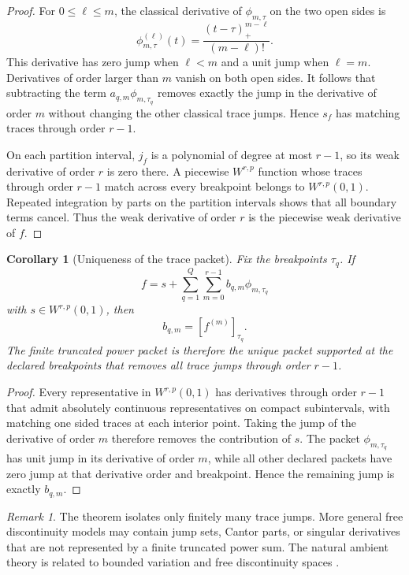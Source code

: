 \documentclass[11pt,a4paper]{article}
\newtheorem{corollary}[theorem]{Corollary}
\theoremstyle{definition}
\theoremstyle{remark}
\newtheorem{remark}[theorem]{Remark}
\newcommand{\jump}[1]{\left[#1\right]}
\begin{document}
\begin{proof}
For \(0\leq \ell\leq m\), the classical derivative of \(\phi_{m,\tau}\) on the two open sides is
\[
\phi_{m,\tau}^{(\ell)}(t)
=
\frac{(t-\tau)_+^{m-\ell}}{(m-\ell)!}.
\]
This derivative has zero jump when \(\ell<m\) and a unit jump when \(\ell=m\). Derivatives of order larger than \(m\) vanish on both open sides. It follows that subtracting the term \(a_{q,m}\phi_{m,\tau_q}\) removes exactly the jump in the derivative of order \(m\) without changing the other classical trace jumps. Hence \(s_f\) has matching traces through order \(r-1\).

On each partition interval, \(j_f\) is a polynomial of degree at most \(r-1\), so its weak derivative of order \(r\) is zero there. A piecewise \(W^{r,p}\) function whose traces through order \(r-1\) match across every breakpoint belongs to \(W^{r,p}(0,1)\). Repeated integration by parts on the partition intervals shows that all boundary terms cancel. Thus the weak derivative of order \(r\) is the piecewise weak derivative of \(f\).
\end{proof}

\begin{corollary}[Uniqueness of the trace packet]\label{cor:trace_packet_uniqueness}
Fix the breakpoints \(\tau_q\). If
\[
f=s+\sum_{q=1}^{Q}\sum_{m=0}^{r-1}b_{q,m}\phi_{m,\tau_q}
\]
with \(s\in W^{r,p}(0,1)\), then
\[
b_{q,m}=\jump{f^{(m)}}_{\tau_q}.
\]
The finite truncated power packet is therefore the unique packet supported at the declared breakpoints that removes all trace jumps through order \(r-1\).
\end{corollary}

\begin{proof}
Every representative in \(W^{r,p}(0,1)\) has derivatives through order \(r-1\) that admit absolutely continuous representatives on compact subintervals, with matching one sided traces at each interior point. Taking the jump of the derivative of order \(m\) therefore removes the contribution of \(s\). The packet \(\phi_{m,\tau_q}\) has unit jump in its derivative of order \(m\), while all other declared packets have zero jump at that derivative order and breakpoint. Hence the remaining jump is exactly \(b_{q,m}\).
\end{proof}

\begin{remark}\label{rem:higher_order_scope}
The theorem isolates only finitely many trace jumps. More general free discontinuity models may contain jump sets, Cantor parts, or singular derivatives that are not represented by a finite truncated power sum. The natural ambient theory is related to bounded variation and free discontinuity spaces \cite{AmbrosioFuscoPallara2000}.
\end{remark}
\end{document}
